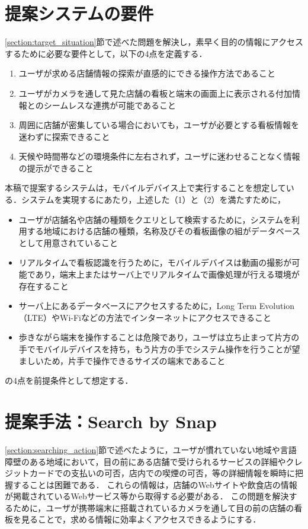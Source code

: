 \section{提案システムの要件}
  \label{subsection:requirement}
  \ref{section:target_situation}節で述べた問題を解決し，素早く目的の情報にアクセスするために必要な要件として，以下の4点を定義する．
  \begin{enumerate}
    \item ユーザが求める店舗情報の探索が直感的にできる操作方法であること
    \item ユーザがカメラを通して見た店舗の看板と端末の画面上に表示される付加情報とのシームレスな連携が可能であること
    \item 周囲に店舗が密集している場合においても，ユーザが必要とする看板情報を迷わずに探索できること
    \item 天候や時間帯などの環境条件に左右されず，ユーザに迷わせることなく情報の提示ができること
  \end{enumerate}
  本稿で提案するシステムは，モバイルデバイス上で実行することを想定している．システムを実現するにあたり，上述した（1）と（2）を満たすために，
  \begin{itemize}
    \item ユーザが店舗名や店舗の種類をクエリとして検索するために，システムを利用する地域における店舗の種類，名称及びその看板画像の組がデータベースとして用意されていること
    \item リアルタイムで看板認識を行うために，モバイルデバイスは動画の撮影が可能であり，端末上またはサーバ上でリアルタイムで画像処理が行える環境が存在すること
    \item サーバ上にあるデータベースにアクセスするために，Long Term Evolution（LTE）やWi-Fiなどの方法でインターネットにアクセスできること
    \item 歩きながら端末を操作することは危険であり，ユーザは立ち止まって片方の手でモバイルデバイスを持ち，もう片方の手でシステム操作を行うことが望ましいため，片手で操作できるサイズの端末であること
  \end{itemize}
  の4点を前提条件として想定する．

\section{提案手法：Search by Snap}
\label{section:design_sbs}
  \ref{section:searching_action}節で述べたように，ユーザが慣れていない地域や言語障壁のある地域において，目の前にある店舗で受けられるサービスの詳細やクレジットカードでの支払いの可否，店内での喫煙の可否，等の詳細情報を瞬時に把握することは困難である．
  これらの情報は，店舗のWebサイトや飲食店の情報が掲載されているWebサービス等から取得する必要がある．
  この問題を解決するために，ユーザが携帯端末に搭載されているカメラを通して目の前の店舗の看板を見ることで，求める情報に効率よくアクセスできるようにする．
  
